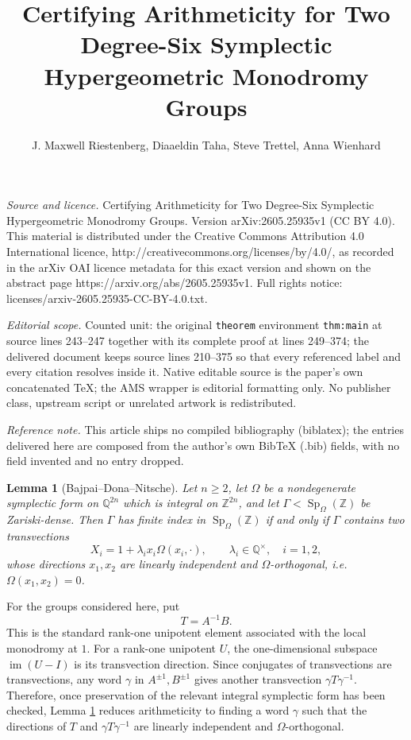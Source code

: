 \documentclass[10pt,a4paper]{amsart}
\newtheorem{lemma}{Lemma}
\DeclareMathOperator{\Sp}{Sp}
\newcommand{\ZZ}{\mathbb{Z}}
\newcommand{\QQ}{\mathbb{Q}}
\begin{document}
\title[Certifying Arithmeticity for Two Degree-Six Symplectic Hyper]{Certifying Arithmeticity for Two Degree-Six Symplectic Hypergeometric Monodromy Groups}
\author{J. Maxwell Riestenberg, Diaaeldin Taha, Steve Trettel, Anna Wienhard}
\date{}
\maketitle
\noindent\emph{Source and licence.} Certifying Arithmeticity for Two Degree-Six Symplectic Hypergeometric Monodromy Groups. Version arXiv:2605.25935v1 (CC BY 4.0). This material is distributed under the Creative Commons Attribution 4.0 International licence, http://creativecommons.org/licenses/by/4.0/, as recorded in the arXiv OAI licence metadata for this exact version and shown on the abstract page https://arxiv.org/abs/2605.25935v1. Full rights notice: licenses/arxiv-2605.25935-CC-BY-4.0.txt.\par\smallskip
\noindent\textit{Editorial scope.} Counted unit: the original \texttt{theorem} environment \texttt{thm:main} at source lines 243--247 together with its complete proof at lines 249--374; the delivered document keeps source lines 210--375 so that every referenced label and every citation resolves inside it. Native editable source is the paper's own concatenated TeX; the AMS wrapper is editorial formatting only. No publisher class, upstream script or unrelated artwork is redistributed.
\par\smallskip\noindent\textit{Reference note.} This article ships no compiled bibliography (biblatex); the entries delivered here are composed from the author's own BibTeX (.bib) fields, with no field invented and no entry dropped.
\begin{lemma}[Bajpai--Dona--Nitsche]\label{lem:bdn}
Let $n\geq 2$, let $\Omega$ be a nondegenerate symplectic form on $\QQ^{2n}$
which is integral on $\ZZ^{2n}$, and let
$\Gamma<\Sp_{\Omega}(\ZZ)$ be Zariski-dense. Then $\Gamma$ has finite index
in $\Sp_{\Omega}(\ZZ)$ if and only if $\Gamma$ contains two transvections
\[
  X_i=1+\lambda_i x_i\Omega(x_i,\cdot),\qquad
  \lambda_i\in\QQ^\times,\quad i=1,2,
\]
whose directions $x_1,x_2$ are linearly independent and
$\Omega$-orthogonal, i.e. $\Omega(x_1,x_2)=0$.
\end{lemma}

For the groups considered here, put
\[
  T=A^{-1}B.
\]
This is the standard rank-one unipotent element associated with the local
monodromy at $1$.  For a rank-one unipotent $U$, the one-dimensional subspace
$\operatorname{im}(U-I)$ is its transvection direction.  Since conjugates of
transvections are transvections, any word $\gamma$ in $A^{\pm1},B^{\pm1}$
gives another transvection $\gamma T\gamma^{-1}$.  Therefore, once
preservation of the relevant integral symplectic form has been checked,
Lemma \ref{lem:bdn} reduces arithmeticity to finding a word $\gamma$ such
that the directions of $T$ and $\gamma T\gamma^{-1}$ are linearly independent
and $\Omega$-orthogonal.
\end{document}
